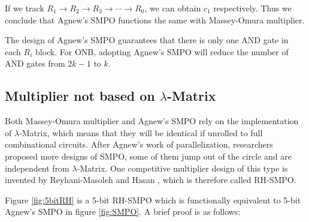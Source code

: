 \begin{Example}
If we track $R_1\to R_2\to R_3 \to \cdots \to R_0$, we can obtain $c_1$ respectively.
Thus we conclude that Agnew's SMPO functions the same with Massey-Omura multiplier.
\end{Example}

The design of Agnew's SMPO guarantees that there is only one AND gate in each $R_i$ block.
For ONB, adopting Agnew's SMPO will reduce the number of AND gates from $2k-1$ to $k$.

\subsection{Multiplier not based on $\lambda$-Matrix}
Both Massey-Omura multiplier and Agnew's SMPO rely on the implementation of $\lambda$-Matrix,
which means that they will be identical if unrolled to full combinational circuits. 
After Agnew's work of parallelization, researchers proposed more designs of SMPO, 
some of them jump out of the circle and are independent from $\lambda$-Matrix.
One competitive multiplier design of this type is invented by Reyhani-Masoleh and Hasan 
\cite{RHmulti}, which is therefore called RH-SMPO.

\begin{figure}[H]
\end{figure}

Figure \ref{fig:5bitRH} is a 5-bit RH-SMPO which is functionally equivalent to 5-bit Agnew's SMPO 
in figure \ref{fig:SMPO}. A brief proof is as follows: 


